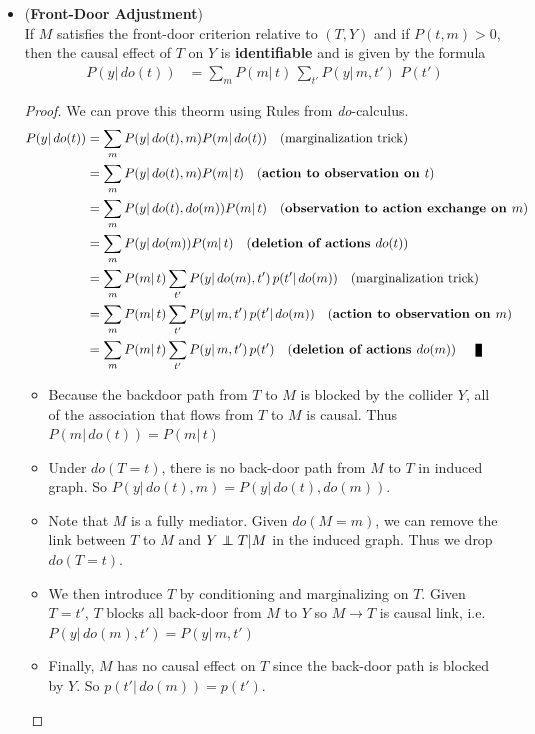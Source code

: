\documentclass[11pt]{article}
\begin{document}
\begin{itemize}
\item \begin{theorem}(\textbf{Front-Door Adjustment}) \citep{pearl2000causal, neal2020introduction}\\
If $M$ satisfies the front-door criterion relative to $(T, Y)$ and if $P(t, m) > 0$, then the causal
effect of $T$ on $Y$ is \textbf{identifiable} and is given by the formula
\begin{align}
P(y | \, do(t)) &=  \sum_{m}P(m|\, t)\,\sum_{t'}P(y|\, m, t')\,\,P(t')
\end{align}
\end{theorem}
\begin{proof}
We can prove this theorm using Rules from \emph{do}-calculus.
\begin{align*}
P(y | \, do(t)) &= \sum_{m} P(y | \, do(t), m) P(m |\, do(t)) \quad (\text{marginalization trick})\\
&= \sum_{m} P(y | \, do(t), m) P(m |\, t) \quad \text{(\textbf{action to observation on $t$})}\\
&=  \sum_{m} P(y | \, do(t), do(m)) P(m |\, t) \quad \text{(\textbf{observation to action exchange on $m$})}\\
&= \sum_{m} P(y | \, do(m)) P(m |\, t) \quad \text{(\textbf{deletion of actions $do(t)$})} \\
&= \sum_{m} P(m |\, t) \sum_{t'} P(y | \, do(m), t')\, p(t' |\, do(m)) \quad (\text{marginalization trick}) \quad  \\
&= \sum_{m} P(m |\, t) \sum_{t'} P(y | \, m,  t')\, p(t' |\, do(m))  \quad \text{(\textbf{action to observation on $m$})} \\
&= \sum_{m} P(m |\, t) \sum_{t'} P(y | \, m,  t')\, p(t')  \quad \text{(\textbf{deletion of actions $do(m)$})} \qed
\end{align*} 
\begin{itemize}
\item  Because the backdoor path from $T$ to $M$ is blocked by the collider $Y$, all of the association that flows from $T$ to $M$ is causal. Thus $P(m |\, do(t)) = P(m |\, t)$

\item Under $do(T=t)$, there is no back-door path from $M$ to $T$ in induced graph. So $P(y | \, do(t), m) = P(y | \, do(t), do(m))$.

\item Note that $M$ is a fully mediator. Given $do(M=m)$, we can remove the link between $T$ to $M$ and $Y \indep T | M$ in the induced graph. Thus we drop $do(T=t)$. 

\item We then introduce $T$ by conditioning and marginalizing on $T$.  Given $T=t'$,  $T$ blocks all back-door from $M$ to $Y$ so $M\rightarrow T$ is causal link, i.e. $P(y | \, do(m), t') = P(y | \,m, t')$

\item Finally, $M$ has no causal effect on $T$ since the back-door path is blocked by $Y$. So $p(t' |\, do(m)) = p(t')$.
\end{itemize}
\end{proof}

\end{itemize}
\end{document}
